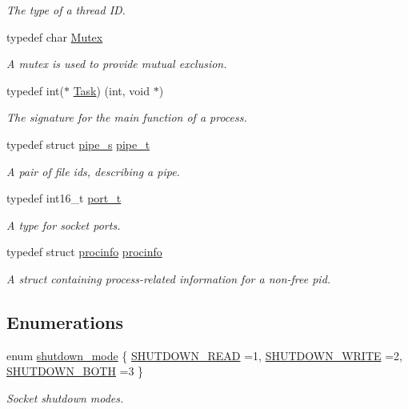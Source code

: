 \begin{DoxyCompactItemize}
\begin{DoxyCompactList}\small\item\em The type of a thread ID. \end{DoxyCompactList}\item 
typedef char \hyperlink{group__syscalls_gaef2ec62cae8e0031fd19fc8b91083ade}{Mutex}
\begin{DoxyCompactList}\small\item\em A mutex is used to provide mutual exclusion. \end{DoxyCompactList}\item 
typedef int($\ast$ \hyperlink{group__syscalls_gaec3f2f835e105271fbbc00272c0ba984}{Task}) (int, void $\ast$)
\begin{DoxyCompactList}\small\item\em The signature for the main function of a process. \end{DoxyCompactList}\item 
typedef struct \hyperlink{structpipe__s}{pipe\+\_\+s} \hyperlink{group__syscalls_gad56b5ceaaf7d3ab88b4be7f622314dfb}{pipe\+\_\+t}
\begin{DoxyCompactList}\small\item\em A pair of file ids, describing a pipe. \end{DoxyCompactList}\item 
typedef int16\+\_\+t \hyperlink{group__syscalls_ga13894e5a2ffd5febb7aeb90e87239d61}{port\+\_\+t}
\begin{DoxyCompactList}\small\item\em A type for socket ports. \end{DoxyCompactList}\item 
typedef struct \hyperlink{structprocinfo}{procinfo} \hyperlink{group__syscalls_ga9682d9066f643f8d18cff58fd3fb09b9}{procinfo}
\begin{DoxyCompactList}\small\item\em A struct containing process-\/related information for a non-\/free pid. \end{DoxyCompactList}\end{DoxyCompactItemize}
\subsection*{Enumerations}
\begin{DoxyCompactItemize}
\item 
enum \hyperlink{group__syscalls_ga9eb10a0a72ca3149140272e9344a272b}{shutdown\+\_\+mode} \{ \hyperlink{group__syscalls_gga9eb10a0a72ca3149140272e9344a272bacbd27e0b4e3d4a02b0d833f919887d2d}{S\+H\+U\+T\+D\+O\+W\+N\+\_\+\+R\+E\+AD} =1, 
\hyperlink{group__syscalls_gga9eb10a0a72ca3149140272e9344a272ba9a7920b6a1eb57633bb981aa60edbe24}{S\+H\+U\+T\+D\+O\+W\+N\+\_\+\+W\+R\+I\+TE} =2, 
\hyperlink{group__syscalls_gga9eb10a0a72ca3149140272e9344a272bab67e72e17566af8eb432d0f3eba6d44d}{S\+H\+U\+T\+D\+O\+W\+N\+\_\+\+B\+O\+TH} =3
 \}\begin{DoxyCompactList}\small\item\em Socket shutdown modes. \end{DoxyCompactList}
\end{DoxyCompactItemize}
